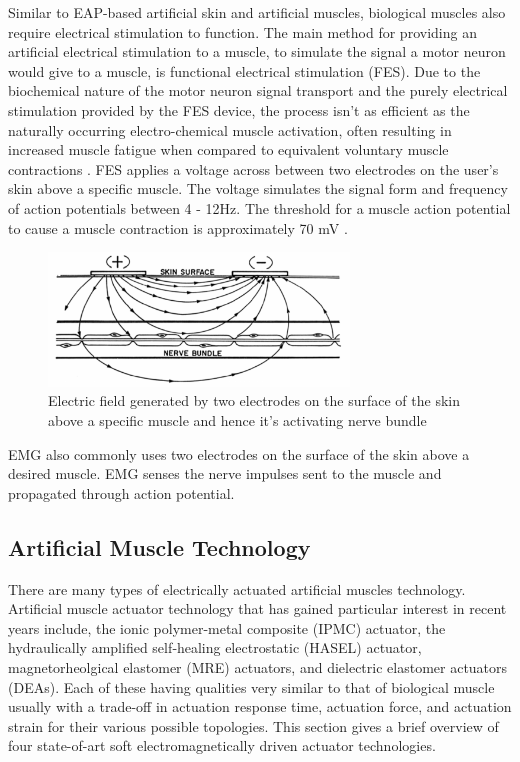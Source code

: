 Similar to EAP-based artificial skin and artificial muscles, biological muscles also require electrical stimulation to function. The main method for providing an artificial electrical stimulation to a muscle, to simulate the signal a motor neuron would give to a muscle, is functional electrical stimulation (FES). Due to the biochemical nature of the motor neuron signal transport and the purely electrical stimulation provided by the FES device, the process isn't as efficient as the naturally occurring electro-chemical muscle activation, often resulting in increased muscle fatigue when compared to equivalent voluntary muscle contractions \citep{Ibitoye2016}. FES applies a voltage across between two electrodes on the user's skin above a specific muscle. The voltage simulates the signal form and frequency of action potentials between 4 - 12Hz\citep{Popovic2004}. The threshold for a muscle action potential to cause a muscle contraction is approximately 70 mV \cite{Schmidt-Nielsen2002}.
\begin{figure}[h!]
  \centering
  \includegraphics[width=8cm]{Figures/FES_electric_field.PNG}
  \caption{Electric field generated by two electrodes on the surface of the skin above a specific muscle and hence it's activating nerve bundle\citep{Bajd2010}}
  \label{fig:Muscle}
\end{figure}
EMG also commonly uses two electrodes on the surface of the skin above a desired muscle. EMG senses the nerve impulses sent to the muscle and propagated through action potential. 



\subsection{Artificial Muscle Technology}
There are many types of electrically actuated artificial muscles technology. Artificial muscle actuator technology that has gained particular interest in recent years include, the ionic polymer-metal composite (IPMC) actuator, the hydraulically amplified self‐healing electrostatic (HASEL) actuator, magnetorheolgical elastomer (MRE) actuators, and dielectric elastomer actuators (DEAs). Each of these having qualities very similar to that of biological muscle usually with a trade-off in actuation response time, actuation force, and actuation strain for their various possible topologies. This section gives a brief overview of four state-of-art soft electromagnetically driven actuator technologies.

